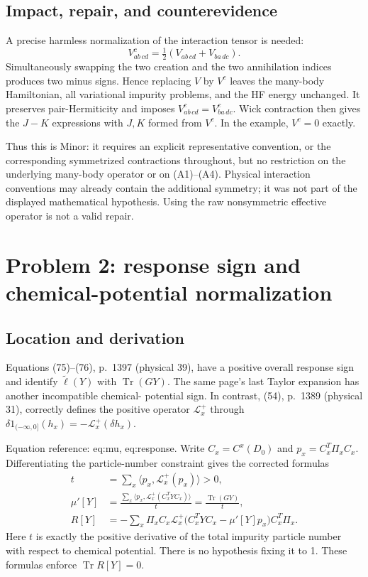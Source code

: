 \documentclass[10pt]{article}
\begin{document}
\subsection*{Impact, repair, and counterevidence}
A precise harmless normalization of the interaction tensor is needed: \[V^c_{ab\,cd}=\tfrac12(V_{ab\,cd}+V_{ba\,dc}).
 \tag{R1}\] Simultaneously swapping the two creation and the two annihilation indices produces two minus signs. Hence replacing \(V\) by \(V^c\) leaves the many-body Hamiltonian, all variational impurity problems, and the HF energy unchanged. It preserves pair-Hermiticity and imposes \(V^c_{ab\,cd}=V^c_{ba\,dc}\). Wick contraction then gives the \(J-K\) expressions with \(J,K\) formed from \(V^c\). In the example, \(V^c=0\) exactly.\par
Thus this is Minor: it requires an explicit representative convention, or the corresponding symmetrized contractions throughout, but no restriction on the underlying many-body operator or on (A1)–(A4). Physical interaction conventions may already contain the additional symmetry; it was not part of the displayed mathematical hypothesis. Using the raw nonsymmetric effective operator is not a valid repair.\par
\section*{Problem 2: response sign and chemical-potential normalization}
\subsection*{Location and derivation}
Equations (75)–(76), p. 1397 (physical 39), have a positive overall response sign and identify \(\widetilde\ell(Y)\) with \(\operatorname{Tr}(GY)\). The same page’s last Taylor expansion has another incompatible chemical- potential sign. In contrast, (54), p. 1389 (physical 31), correctly defines the positive operator \(\mathcal L_x^+\) through \(\delta 1_{(-\infty,0]}(h_x)=-\mathcal L_x^+(\delta h_x)\).\par
Equation reference: eq:mu, eq:response. Write \(C_x=C^x(D_0)\) and \(p_x=C_x^T\Pi_x C_x\). Differentiating the particle-number constraint gives the corrected formulas \[\begin{aligned}
 t&=\sum_x\langle p_x,\mathcal L_x^+(p_x)\rangle>0,\\
 \mu'[Y]&=\frac{\sum_x\langle p_x,
             \mathcal L_x^+(C_x^T Y C_x)\rangle}{t}
          =\frac{\operatorname{Tr}(GY)}{t},\\
 R[Y]&=-\sum_x\Pi_x C_x\mathcal L_x^+
       \bigl(C_x^T Y C_x-\mu'[Y]p_x\bigr)C_x^T\Pi_x.
       \end{aligned}\] Here \(t\) is exactly the positive derivative of the total impurity particle number with respect to chemical potential. There is no hypothesis fixing it to 1. These formulas enforce \(\operatorname{Tr}R[Y]=0\).\par
\end{document}

